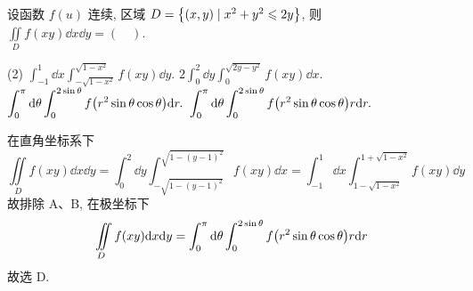 
\begin{example}
    设函数 $f(u)$ 连续, 区域 $D=\qty{(x,y)\mid x^2+y^2\leqslant 2y}$, 则 $\displaystyle\iint\limits_D f(xy)\dd x\dd y=(\quad)$.
    \begin{tasks}(2)
        \task $\displaystyle \int_{-1}^{1}\dd x\int_{-\sqrt{1-x^2}}^{\sqrt{1-x^2}}f(xy)\dd y.$
        \task $\displaystyle 2\int_{0}^{2}\dd y\int_{0}^{\sqrt{2y-y^2}}f(xy)\dd x.$
        \task $\displaystyle \int_{0}^{\pi}\dd \theta\int_{0}^{2\sin\theta}f\qty(r^2\sin\theta\cos\theta)\dd r.$
        \task $\displaystyle \int_{0}^{\pi}\dd \theta\int_{0}^{2\sin\theta}f\qty(r^2\sin\theta\cos\theta)r\dd r.$
    \end{tasks}
\end{example}
\begin{solution}
    在直角坐标系下
    $$\iint\limits_Df(xy)\dd x\dd y=\int_{0}^{2}\dd y\int_{-\sqrt{1-(y-1)^2}}^{\sqrt{1-(y-1)^2}}f(xy)\dd x=\int_{-1}^{1}\dd x\int_{1-\sqrt{1-x^2}}^{1+\sqrt{1-x^2}}f(xy)\dd y$$
    故排除 A、B, 在极坐标下
    $$\iint\limits_D f(xy)\dd x\dd y=\int_{0}^{\pi}\dd \theta\int_{0}^{2\sin\theta}f\qty(r^2\sin\theta\cos\theta)r\dd r$$
    故选 D.
\end{solution}


